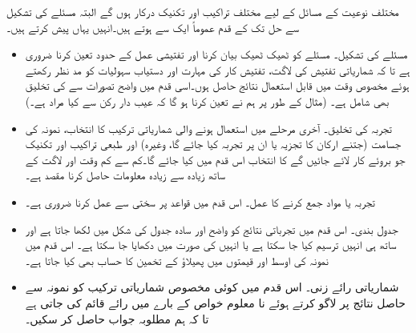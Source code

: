 مختلف نوعیت کے مسائل کے لیے مختلف تراکیب اور تکنیک  درکار ہوں گے البتہ مسئلے کی تشکیل سے حل تک کے قدم عموماً ایک سے ہوتے ہیں۔انہیں یہاں پیش کرتے ہیں۔
\begin{itemize}
\item{مسئلے کی تشکیل۔}
مسئلے کو ٹھیک ٹھیک بیان کرنا اور تفتیشی عمل کے حدود تعین کرنا ضروری ہے تا کہ شماریاتی تفتیش کی لاگت، تفتیش کار کی مہارت اور دستیاب سہولیات کو مد نظر رکھتے ہوئے مخصوص  وقت میں قابل استعمال نتائج حاصل ہوں۔اسی قدم میں واضح تصورات سے   کی تخلیق بھی شامل ہے۔ (مثال کے طور پر ہم نے تعین کرنا ہو گا کہ عیب دار رکن سے کیا مراد ہے۔)
\item{تجربہ کی تخلیق۔}
آخری مرحلے میں استعمال ہونے والی شماریاتی ترکیب کا انتخاب، نمونہ کی جسامت (جتنے ارکان کا تجزیہ  یا ان پر تجربہ کیا جائے گا، وغیرہ) اور طبعی تراکیب اور تکنیک جو بروئے کار لائے جائیں گے کا انتخاب اس قدم میں کیا جائے گا۔کم سے کم وقت اور لاگت کے ساتھ زیادہ سے زیادہ معلومات حاصل کرنا مقصد ہے۔
\item{تجربہ یا مواد جمع کرنے کا عمل۔}
اس قدم میں قواعد پر سختی سے عمل کرنا ضروری ہے۔
\item{جدول بندی۔}
اس قدم میں تجرباتی نتائج کو واضح اور سادہ جدول کی شکل میں لکھا جاتا ہے اور ساتھ ہی انہیں ترسیم کیا جا سکتا ہے یا انہیں  کی صورت میں دکھایا جا سکتا ہے۔ اس قدم میں نمونہ کی اوسط اور قیمتوں میں پھیلاؤ کے تخمین کا حساب بھی کیا جاتا ہے۔
\item{شماریاتی رائے زنی۔}
اس قدم میں کوئی مخصوص شماریاتی ترکیب کو نمونہ سے حاصل  نتائج پر لاگو کرتے ہوئے نا معلوم خواص کے بارے میں رائے قائم کی جاتی ہے تا کہ ہم مطلوبہ جواب حاصل کر سکیں۔  
\end{itemize}

